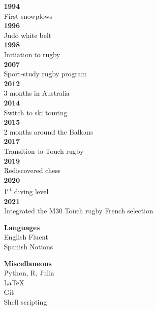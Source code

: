 \documentclass{article}
\begin{document}
\hfill\vline\hfill
\begin{minipage}{0.15\textwidth}
    \begin{minipage}{1\textwidth}
    \begin{flushleft}
        \textbf{1994} \\
        First snowplows \\[.2cm]
        \textbf{1996} \\
        Judo white belt \\[.2cm]
        \textbf{1998} \\
        Initiation to rugby \\[.9cm]
        \textbf{2007} \\
        Sport-study rugby program \\[.5cm]
        \textbf{2012} \\
        3 months in Australia \\[.2cm]
        \textbf{2014} \\
        Switch to ski touring \\[.1cm]
        \textbf{2015} \\
        2 months around the Balkans \\[.2cm]
        \textbf{2017} \\
        Transition to Touch rugby \\[.2cm]
        \textbf{2019} \\
        Rediscovered chess \\[.1cm]
        \textbf{2020} \\
        1\textsuperscript{st} diving level \\[.1cm]
        \textbf{2021} \\
        Integrated the M30 Touch rugby French selection
    \end{flushleft}
    \end{minipage}
    \begin{minipage}{1\textwidth}
    \vspace{8.6cm}
    \begin{flushleft}
        \textbf{Languages} \\[.1cm]
        English \quad Fluent \\
        Spanish \quad Notions
    \end{flushleft}
    \end{minipage}
    \begin{minipage}{1\textwidth}
    \vspace{1cm}
    \begin{flushleft}
        \textbf{Miscellaneous} \\[.1cm]
        Python, R, Julia \\
        \LaTeX \\
        Git \\
        Shell scripting
    \end{flushleft}
    \end{minipage}
\end{minipage}
\end{document}
